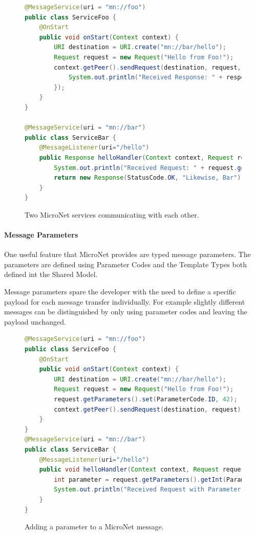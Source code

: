 \begin{figure}
\begin{lstlisting}[language=Java,firstnumber=1] 
@MessageService(uri = "mn://foo")
public class ServiceFoo {
	@OnStart
	public void onStart(Context context) {
		URI destination = URI.create("mn://bar/hello");
		Request request = new Request("Hello from Foo!");
		context.getPeer().sendRequest(destination, request, response -> {
			System.out.println("Received Response: " + response.getData());
		});
	}
}

@MessageService(uri = "mn://bar")
public class ServiceBar {
	@MessageListener(uri="/hello")
	public Response helloHandler(Context context, Request request) {
		System.out.println("Received Request: " + request.getData());
		return new Response(StatusCode.OK, "Likewise, Bar");
	}
}
\end{lstlisting}
\caption{Two MicroNet services communicating with each other.}
\label{lst:service_communication}
\end{figure}

\paragraph{Message Parameters}

One useful feature that MicroNet provides are typed message parameters. The
parameters are defined using Parameter Codes and the Template Types both defined
int the Shared Model.

Message parameters spare the developer with the need to define a specific
payload for each message transfer individually. For example slightly different
messages can be distinguished by only using parameter codes and leaving the
payload unchanged.

\begin{figure}
\begin{lstlisting}[language=Java,firstnumber=1] 
@MessageService(uri = "mn://foo")
public class ServiceFoo {
	@OnStart
	public void onStart(Context context) {
		URI destination = URI.create("mn://bar/hello");
		Request request = new Request("Hello from Foo!");
		request.getParameters().set(ParameterCode.ID, 42);
		context.getPeer().sendRequest(destination, request);
	}
}
@MessageService(uri = "mn://bar")
public class ServiceBar {
	@MessageListener(uri="/hello")
	public void helloHandler(Context context, Request request) {
		int parameter = request.getParameters().getInt(ParameterCode.ID);
		System.out.println("Received Request with Parameter: " + parameter);
	}
}
\end{lstlisting}
\caption{Adding a parameter to a MicroNet message.}
\label{lst:message_parameters}
\end{figure}

